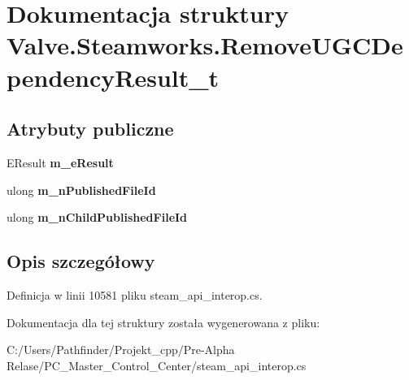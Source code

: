 \hypertarget{struct_valve_1_1_steamworks_1_1_remove_u_g_c_dependency_result__t}{}\section{Dokumentacja struktury Valve.\+Steamworks.\+Remove\+U\+G\+C\+Dependency\+Result\+\_\+t}
\label{struct_valve_1_1_steamworks_1_1_remove_u_g_c_dependency_result__t}
\subsection*{Atrybuty publiczne}
\begin{DoxyCompactItemize}
\item 
\mbox{\label{struct_valve_1_1_steamworks_1_1_remove_u_g_c_dependency_result__t_adeafc8b4742d3e055eaeabfa37392c09}} 
E\+Result {\bfseries m\+\_\+e\+Result}
\item 
\mbox{\label{struct_valve_1_1_steamworks_1_1_remove_u_g_c_dependency_result__t_acff6c2a83fd4dc2f8374350aa95da69c}} 
ulong {\bfseries m\+\_\+n\+Published\+File\+Id}
\item 
\mbox{\label{struct_valve_1_1_steamworks_1_1_remove_u_g_c_dependency_result__t_ac5907d7ab3c1feb81831142ad29b2420}} 
ulong {\bfseries m\+\_\+n\+Child\+Published\+File\+Id}
\end{DoxyCompactItemize}


\subsection{Opis szczegółowy}


Definicja w linii 10581 pliku steam\+\_\+api\+\_\+interop.\+cs.



Dokumentacja dla tej struktury została wygenerowana z pliku\+:\begin{DoxyCompactItemize}
\item 
C\+:/\+Users/\+Pathfinder/\+Projekt\+\_\+cpp/\+Pre-\/\+Alpha Relase/\+P\+C\+\_\+\+Master\+\_\+\+Control\+\_\+\+Center/steam\+\_\+api\+\_\+interop.\+cs\end{DoxyCompactItemize}
